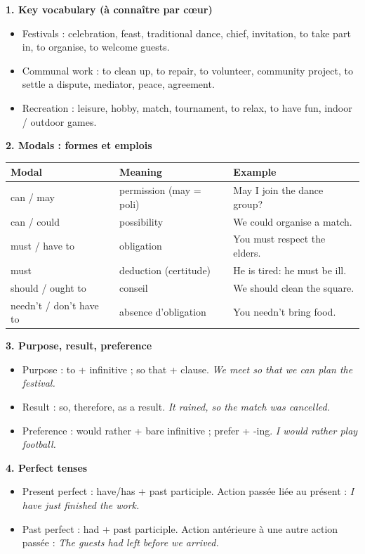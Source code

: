 \documentclass[11pt]{article}
\newcommand{\cle}[1]{{\popxbold\color{popdark}#1}}
\begin{document}
\begin{aretenir}
\textbf{1. Key vocabulary (à connaître par c\oe ur)}
\begin{itemize}
\item \cle{Festivals} : celebration, feast, traditional dance, chief, invitation, to take part in, to organise, to welcome guests.
\item \cle{Communal work} : to clean up, to repair, to volunteer, community project, to settle a dispute, mediator, peace, agreement.
\item \cle{Recreation} : leisure, hobby, match, tournament, to relax, to have fun, indoor / outdoor games.
\end{itemize}

\textbf{2. Modals : formes et emplois}
\begin{center}
\begin{tabularx}{\linewidth}{|l|X|X|}
\hline
\rowcolor{popblueL} \textbf{Modal} & \textbf{Meaning} & \textbf{Example} \\
\hline
can / may & permission (may = poli) & May I join the dance group? \\
\hline
can / could & possibility & We could organise a match. \\
\hline
must / have to & obligation & You must respect the elders. \\
\hline
must & deduction (certitude) & He is tired: he must be ill. \\
\hline
should / ought to & conseil & We should clean the square. \\
\hline
needn't / don't have to & absence d'obligation & You needn't bring food. \\
\hline
\end{tabularx}
\end{center}

\textbf{3. Purpose, result, preference}
\begin{itemize}
\item \cle{Purpose} : to + infinitive ; so that + clause. \emph{We meet so that we can plan the festival.}
\item \cle{Result} : so, therefore, as a result. \emph{It rained, so the match was cancelled.}
\item \cle{Preference} : would rather + bare infinitive ; prefer + -ing. \emph{I would rather play football.}
\end{itemize}

\textbf{4. Perfect tenses}
\begin{itemize}
\item \cle{Present perfect} : have/has + past participle. Action passée liée au présent : \emph{I have just finished the work.}
\item \cle{Past perfect} : had + past participle. Action antérieure à une autre action passée : \emph{The guests had left before we arrived.}
\end{itemize}


\end{aretenir}
\end{document}
